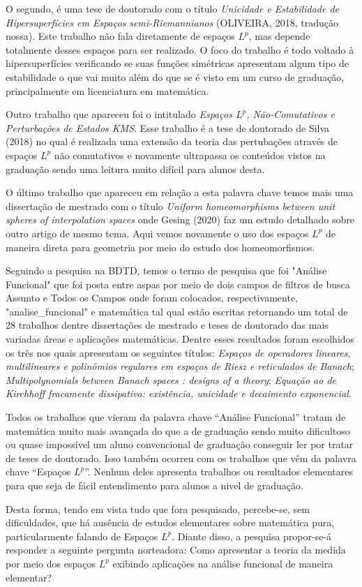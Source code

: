 O segundo, é uma tese de doutorado com o título \textit{Unicidade e Estabilidade de Hipersuperfícies em Espaços semi-Riemannianos} (OLIVEIRA, 2018, tradução nossa).
Este trabalho não fala diretamente de espaços $L^p$, mas depende totalmente desses espaços para ser realizado.
O foco do trabalho é todo voltado à hipersuperfícies verificando se suas funções simétricas apresentam algum tipo de estabilidade o que vai muito além do que se é visto em um curso de graduação, principalmente em licenciatura em matemática.

Outro trabalho que apareceu foi o intitulado \textit{Espaços $L^p$, Não-Comutativos e Perturbações de Estados KMS}.
Esse trabalho é a tese de doutorado de Silva (2018) no qual é realizada uma extensão da teoria das pertubações através de espaços $L^p$ não comutativos e novamente ultrapassa os conteúdos vistos na graduação sendo uma leitura muito difícil para alunos desta.

O último trabalho que apareceu em relação a esta palavra chave temos mais uma dissertação de mestrado com o título \textit{Uniform homeomorphisms between unit
spheres of interpolation spaces} onde Gesing (2020) faz um estudo detalhado sobre outro artigo de mesmo tema. 
Aqui vemos novamente o uso dos espaços $L^p$ de maneira direta para geometria por meio do estudo dos homeomorfismos.

Seguindo a pesquisa na BDTD, temos o termo de pesquisa que foi "Análise Funcional" que foi posta entre aspas por meio de dois campos de filtros de busca Assunto e Todos os Campos onde foram colocados, respectivamente, "analise\_funcional" e matemática tal qual estão escritas retornando um total de 28 trabalhos dentre dissertações de mestrado e teses de doutorado das mais variadas áreas e aplicações matemáticas.
Dentre esses resultados foram escolhidos os três nos quais apresentam os seguintes títulos: \textit{Espaços de operadores lineares, multilineares e polinômios regulares em espaços de Riesz e reticulados de Banach}; \textit{Multipolynomials between Banach spaces : designs of a theory}; \textit{Equação ao de Kirchhoff fracamente dissipativa: existência, unicidade e decaimento exponencial}.

Todos os trabalhos que vieram da palavra chave \enquote{Análise Funcional} tratam de matemática muito mais avançada do que a de graduação sendo muito dificultoso ou quase impossível um aluno convencional de graduação conseguir ler por tratar de teses de doutorado.
Isso também ocorreu com os trabalhos que vêm da palavra chave \enquote{Espaços $L^p$}. 
Nenhum deles apresenta trabalhos ou resultados elementares para que seja de fácil entendimento para alunos a nivel de graduação.

Desta forma, tendo em vista tudo que fora pesquisado, percebe-se, sem dificuldades, que há ausência de estudos elementares sobre matemática pura, particularmente falando de Espaços $L^p$. Diante disso, a pesquisa propor-se-á responder a seguinte pergunta norteadora: Como apresentar a teoria da medida por meio dos espaços $L^p$ exibindo aplicações na análise funcional de maneira elementar?